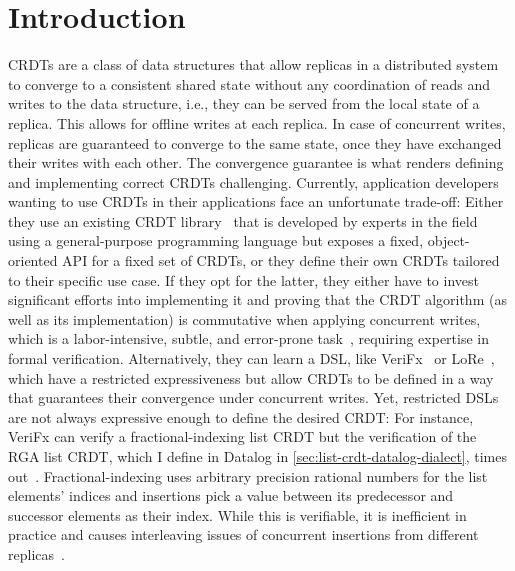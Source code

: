 
\chapter{Introduction}\label{ch:intro}

\acp{CRDT} are a class of data structures that allow replicas in a distributed
system to converge to a consistent shared state without any coordination
of reads and writes to the data structure, i.e., they can be served from the
local state of a replica.
This allows for offline writes at each replica.
In case of concurrent writes, replicas are guaranteed to converge to the same state,
once they have exchanged their writes with each other.
The convergence guarantee is what renders defining and implementing
correct \acp{CRDT} challenging.
Currently, application developers wanting to use \acp{CRDT} in their applications
face an unfortunate trade-off:
Either they use an existing \ac{CRDT} library~\cite{automerge,yjs,lore}
that is developed by experts in the field using a general-purpose programming language
but exposes a fixed, object-oriented \acs{API} for a fixed set of \acp{CRDT},
or they define their own \acp{CRDT} tailored to their specific use case.
If they opt for the latter, they either have to invest significant efforts
into implementing it and proving that the \ac{CRDT} algorithm
(as well as its implementation) is commutative when applying concurrent writes,
which is a labor-intensive, subtle, and error-prone
task~\cite{gomes2017verifying,kleppmann2022assessing},
requiring expertise in formal verification.
Alternatively, they can learn a \ac{DSL}, like VeriFx~\cite{verifx}
or LoRe~\cite{lore}, which have a restricted expressiveness but allow
\acp{CRDT} to be defined in a way that guarantees their convergence under
concurrent writes.
Yet, restricted \acp{DSL} are not always expressive enough
to define the desired \ac{CRDT}:
For instance, VeriFx can verify a fractional-indexing list \ac{CRDT}
but the verification of the RGA list \ac{CRDT}, which I define in Datalog in
\ref{sec:list-crdt-datalog-dialect}, times out~\cite{verifx}.
Fractional-indexing uses arbitrary precision rational numbers for the list
elements' indices and insertions pick a value between its predecessor and
successor elements as their index.
While this is verifiable, it is inefficient in practice and causes
interleaving issues of concurrent insertions from different replicas~\cite{fugue}.

